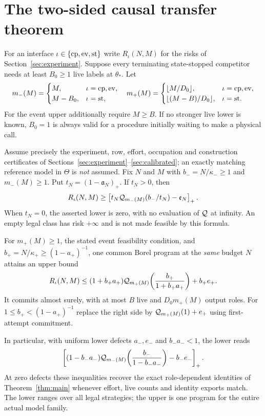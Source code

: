 \section{The two-sided causal transfer theorem}
\label{sec:reference-stability}
For an interface $\iota\in\{\mathrm{cp},\mathrm{ev},\mathrm{st}\}$ write $R_\iota(N,M)$ for the risks of Section~\ref{sec:experiment}. Suppose every terminating state-stopped competitor needs at least $B_0\ge1$ live labels at $\theta_*$. Let
\[
 m_-(M)=
 \begin{cases}M,&\iota=\mathrm{cp},\mathrm{ev},\\M-B_0,&\iota=\mathrm{st},\end{cases}
 \quad
 m_+(M)=
 \begin{cases}\lfloor M/D_0\rfloor,&\iota=\mathrm{cp},\mathrm{ev},\\
 \lfloor(M-B)/D_0\rfloor,&\iota=\mathrm{st}.
 \end{cases}
\]
For the event upper additionally require $M\ge B$. If no stronger live lower is known, $B_0=1$ is always valid for a procedure initially waiting to make a physical call.

\begin{theorem}
\label{thm:reference-stability}
Assume precisely the experiment, row, effort, occupation and construction certificates of Sections~\ref{sec:experiment}--\ref{sec:calibrated}; an exactly matching reference model in $\Theta$ is \emph{not} assumed. Fix $N$ and $M$ with $b_-=N/\kappa_-\ge1$ and $m_-(M)\ge1$. Put $t_N=(1-\mathfrak a_N)_+$. If $t_N>0$, then
\begin{equation}\label{eq:reference-lower}
 R_\iota(N,M)\ge
 \left[t_N\mathcal Q_{m_-(M)}(b_-/t_N)-\mathfrak e_N\right]_+.
\end{equation}
When $t_N=0$, the asserted lower is zero, with no evaluation of $\mathcal Q$ at infinity. An empty legal class has risk $+\infty$ and is not made feasible by this formula.

For $m_+(M)\ge1$, the stated event feasibility condition, and
$b_+=N/\kappa_+\ge(1-a_+)^{-1}$, one common Borel program at the \emph{same} budget $N$ attains an upper bound
\begin{equation}\label{eq:reference-upper}
 R_\iota(N,M)\le
 (1+b_+a_+)\mathcal Q_{m_+(M)}\!\left(\frac{b_+}{1+b_+a_+}\right)+b_+e_+.
\end{equation}
It commits almost surely, with at most $B$ live and $D_0m_+(M)$ output roles. For $1\le b_+<(1-a_+)^{-1}$ replace the right side by $\mathcal Q_{m_+(M)}(1)+e_+$ using first-attempt commitment.

In particular, with uniform lower defects $a_-,e_-$ and $b_-a_-<1$, the lower reads
\begin{equation}\label{eq:uniform-reference-lower}
 \left[(1-b_-a_-)\mathcal Q_{m_-(M)}
       \!\left(\frac{b_-}{1-b_-a_-}\right)-b_-e_-\right]_+.
\end{equation}
At zero defects these inequalities recover the exact role-dependent identities of Theorem~\ref{thm:main} whenever effort, live counts and identity exports match. The lower ranges over all legal strategies; the upper is one program for the entire actual model family.
\end{theorem}

